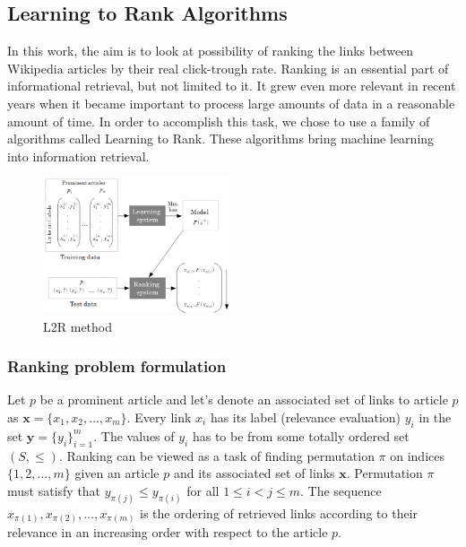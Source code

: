 \subsection{Learning to Rank Algorithms}

In this work, the aim is to look at possibility of ranking the links between Wikipedia articles by their real click-trough rate. Ranking is an essential part of informational retrieval, but not limited to it. It grew even more relevant in recent years when it became important to process large amounts of data in a reasonable amount of time. In order to accomplish this task, we chose to use a family of algorithms called Learning to Rank. These algorithms bring machine learning into information retrieval.

\begin{figure}[H]
    \includegraphics[width=0.49\textwidth]{images/l2r}
 \caption{L2R method}
 \label{fig:l2r}
\end{figure}

\subsubsection{Ranking problem formulation}
Let $p$ be a prominent article and let's denote an associated set of links to article $p$ as $\mathbf{x} = \{x_1, x_2, \ldots, x_m\}$. Every link $x_i$ has its label (relevance evaluation) $y_i$ in the set $\mathbf{y} = \{y_i\}^m_{i=1}$. The values of $y_i$ has to be from some totally ordered set $(S, \le)$.  Ranking can be viewed as a task of finding permutation $\pi$ on indices $\{1,2,\ldots, m\}$ given an article $p$ and its associated set of links $\mathbf{x}$. Permutation $\pi$ must satisfy that $y_{\pi(j)} \le y_{\pi(i)}$ for all $1\le i < j \le m$. The sequence $x_{\pi(1)},x_{\pi(2)}, \ldots, x_{\pi(m)}$ is the ordering of retrieved links according to their relevance in an increasing order with respect to the article $p$.
%
%
%
%
%
%

